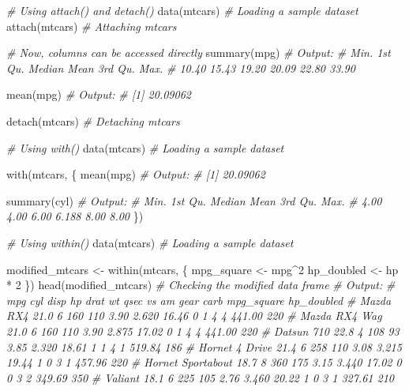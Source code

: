 \documentclass[
]{article}
\newenvironment{Shaded}{}{}
\newcommand{\CommentTok}[1]{\textcolor[rgb]{0.38,0.63,0.69}{\textit{#1}}}
\newcommand{\DecValTok}[1]{\textcolor[rgb]{0.25,0.63,0.44}{#1}}
\newcommand{\FunctionTok}[1]{\textcolor[rgb]{0.02,0.16,0.49}{#1}}
\newcommand{\NormalTok}[1]{#1}
\newcommand{\OtherTok}[1]{\textcolor[rgb]{0.00,0.44,0.13}{#1}}
\newcommand{\SpecialCharTok}[1]{\textcolor[rgb]{0.25,0.44,0.63}{#1}}
\begin{document}
\begin{Shaded}
\begin{Highlighting}[]
\CommentTok{\# Using attach() and detach()}
\FunctionTok{data}\NormalTok{(mtcars) }\CommentTok{\# Loading a sample dataset}
\FunctionTok{attach}\NormalTok{(mtcars) }\CommentTok{\# Attaching mtcars}

\CommentTok{\# Now, columns can be accessed directly}
\FunctionTok{summary}\NormalTok{(mpg)}
\CommentTok{\# Output:}
\CommentTok{\#    Min. 1st Qu.  Median    Mean 3rd Qu.    Max. }
\CommentTok{\#  10.40   15.43   19.20   20.09   22.80   33.90 }

\FunctionTok{mean}\NormalTok{(mpg)}
\CommentTok{\# Output:}
\CommentTok{\# [1] 20.09062}

\FunctionTok{detach}\NormalTok{(mtcars) }\CommentTok{\# Detaching mtcars}

\CommentTok{\# Using with()}
\FunctionTok{data}\NormalTok{(mtcars) }\CommentTok{\# Loading a sample dataset}

\FunctionTok{with}\NormalTok{(mtcars, \{}
  \FunctionTok{mean}\NormalTok{(mpg)}
  \CommentTok{\# Output:}
  \CommentTok{\# [1] 20.09062}
  
  \FunctionTok{summary}\NormalTok{(cyl)}
  \CommentTok{\# Output:}
  \CommentTok{\#   Min. 1st Qu.  Median    Mean 3rd Qu.    Max. }
  \CommentTok{\#   4.00   4.00    6.00    6.188   8.00    8.00 }
\NormalTok{\})}

\CommentTok{\# Using within()}
\FunctionTok{data}\NormalTok{(mtcars) }\CommentTok{\# Loading a sample dataset}

\NormalTok{modified\_mtcars }\OtherTok{\textless{}{-}} \FunctionTok{within}\NormalTok{(mtcars, \{}
\NormalTok{  mpg\_square }\OtherTok{\textless{}{-}}\NormalTok{ mpg}\SpecialCharTok{\^{}}\DecValTok{2}
\NormalTok{  hp\_doubled }\OtherTok{\textless{}{-}}\NormalTok{ hp }\SpecialCharTok{*} \DecValTok{2}
\NormalTok{\})}
\FunctionTok{head}\NormalTok{(modified\_mtcars) }\CommentTok{\# Checking the modified data frame}
\CommentTok{\# Output:}
\CommentTok{\#                    mpg cyl disp  hp drat    wt  qsec vs am gear carb mpg\_square hp\_doubled}
\CommentTok{\# Mazda RX4         21.0   6  160 110 3.90 2.620 16.46  0  1    4    4     441.00       220}
\CommentTok{\# Mazda RX4 Wag     21.0   6  160 110 3.90 2.875 17.02  0  1    4    4     441.00       220}
\CommentTok{\# Datsun 710        22.8   4  108  93 3.85 2.320 18.61  1  1    4    1     519.84       186}
\CommentTok{\# Hornet 4 Drive    21.4   6  258 110 3.08 3.215 19.44  1  0    3    1     457.96       220}
\CommentTok{\# Hornet Sportabout 18.7   8  360 175 3.15 3.440 17.02  0  0    3    2     349.69       350}
\CommentTok{\# Valiant           18.1   6  225 105 2.76 3.460 20.22  1  0    3    1     327.61       210}
\end{Highlighting}
\end{Shaded}
\end{document}
